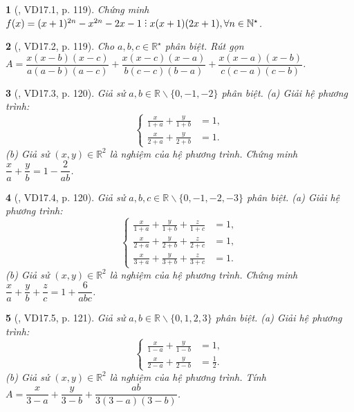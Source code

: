 \documentclass{article}
\newtheorem{baitoan}{}
\DeclareRobustCommand{\divby}{%
	\mathrel{\vbox{\baselineskip.65ex\lineskiplimit0pt\hbox{.}\hbox{.}\hbox{.}}}%
}
\begin{document}
\begin{baitoan}[\cite{TLCT_THCS_Toan_9_dai_so}, VD17.1, p. 119]
	Chứng minh $f(x) = (x + 1)^{2n} - x^{2n} - 2x - 1\divby x(x + 1)(2x + 1),\forall n\in\mathbb{N}^\star$.
\end{baitoan}

\begin{baitoan}[\cite{TLCT_THCS_Toan_9_dai_so}, VD17.2, p. 119]
	Cho $a,b,c\in\mathbb{R}^\star$ phân biệt. Rút gọn $A = \dfrac{x(x - b)(x - c)}{a(a - b)(a - c)} + \dfrac{x(x - c)(x - a)}{b(c - c)(b - a)} + \dfrac{x(x - a)(x - b)}{c(c - a)(c - b)}$.
\end{baitoan}

\begin{baitoan}[\cite{TLCT_THCS_Toan_9_dai_so}, VD17.3, p. 120]
	Giả sử $a,b\in\mathbb{R}\backslash\{0,-1,-2\}$ phân biệt. (a) Giải hệ phương trình:
	\begin{equation*}
		\left\{\begin{split}
			\frac{x}{1 + a} + \frac{y}{1 + b} &= 1,\\
			\frac{x}{2 + a} + \frac{y}{2 + b} &= 1.
		\end{split}\right.
	\end{equation*}
	(b) Giả sử $(x,y)\in\mathbb{R}^2$ là nghiệm của hệ phương trình. Chứng minh $\dfrac{x}{a} + \dfrac{y}{b} = 1 - \dfrac{2}{ab}$.
\end{baitoan}

\begin{baitoan}[\cite{TLCT_THCS_Toan_9_dai_so}, VD17.4, p. 120]
	Giả sử $a,b,c\in\mathbb{R}\backslash\{0,-1,-2,-3\}$ phân biệt. (a) Giải hệ phương trình:
	\begin{equation*}
		\left\{\begin{split}
			\frac{x}{1 + a} + \frac{y}{1 + b} + \frac{z}{1 + c} &= 1,\\
			\frac{x}{2 + a} + \frac{y}{2 + b} + \frac{z}{2 + c} &= 1,\\
			\frac{x}{3 + a} + \frac{y}{3 + b} + \frac{z}{3 + c} &= 1.
		\end{split}\right.
	\end{equation*}
	(b) Giả sử $(x,y)\in\mathbb{R}^2$ là nghiệm của hệ phương trình. Chứng minh $\dfrac{x}{a} + \dfrac{y}{b} + \dfrac{z}{c} = 1 + \dfrac{6}{abc}$.
\end{baitoan}

\begin{baitoan}[\cite{TLCT_THCS_Toan_9_dai_so}, VD17.5, p. 121]
	Giả sử $a,b\in\mathbb{R}\backslash\{0,1,2,3\}$ phân biệt. (a) Giải hệ phương trình:
	\begin{equation*}
		\left\{\begin{split}
			\frac{x}{1 - a} + \frac{y}{1 - b} &= 1,\\
			\frac{x}{2 - a} + \frac{y}{2 - b} &= \frac{1}{2}.
		\end{split}\right.
	\end{equation*}
	(b) Giả sử $(x,y)\in\mathbb{R}^2$ là nghiệm của hệ phương trình. Tính $A = \dfrac{x}{3 - a} + \dfrac{y}{3 - b} + \dfrac{ab}{3(3 - a)(3 - b)}$.
\end{baitoan}
\end{document}
